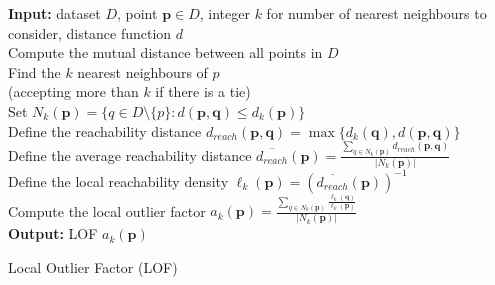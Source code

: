 \begin{algorithm}[ht]
\SetAlgoLined
\textbf{Input:} dataset $D$, point $\mathbf{p} \in D$, integer $k$ for number of nearest neighbours to consider, distance function $d$
\\ Compute the mutual distance between all points in $D$
\\
Find the $k$ nearest neighbours of $p$ 
\\(accepting more than $k$ if there is a tie)
\\ Set $N_k(\mathbf{p}) = \{ q \in D \setminus \{p\} : d(\mathbf{p}, \mathbf{q}) \leq d_k(\mathbf{p}) \}$
\\ Define the reachability distance
$d_{reach}(\mathbf{p},\mathbf{q}) = \max\{d_k(\mathbf{q}), d(\mathbf{p},\mathbf{q})\}$
\\ Define the average reachability distance $\overline{d_{reach}}(\mathbf{p}) 
= \frac{\sum_{q \in N_k(\mathbf{p})} d_{reach}(\mathbf{p},\mathbf{q})}{\lvert N_k(\mathbf{p}) \rvert}$
\\Define the local reachability density
$\ell_k(\mathbf{p}) = \left( \overline{d_{reach}}(\mathbf{p}) \right)^{-1}$
\\Compute the local outlier factor
$a_k(\mathbf{p})
= \frac{\sum_{q \in N_k(\mathbf{p})} \frac{\ell_k(\mathbf{q})}{\ell_k(\mathbf{p})}}{\lvert N_k(\mathbf{p}) \rvert}$
\\ \textbf{Output:} LOF $a_k(\mathbf{p})$
\caption{Local Outlier Factor (LOF)}
\end{algorithm}